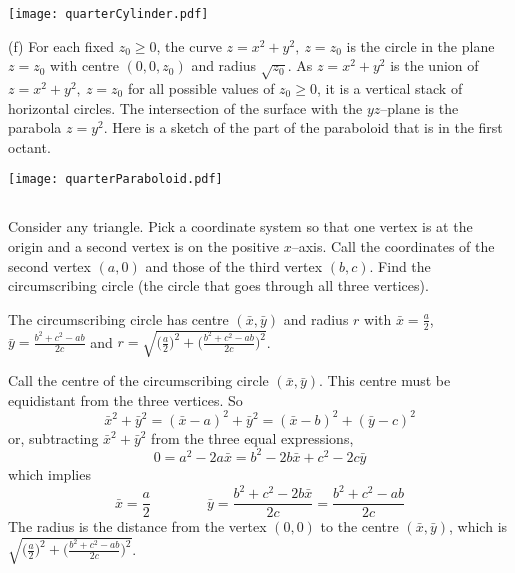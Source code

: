\begin{solution}
\begin{center}
     \texttt{[image: quarterCylinder.pdf]}
\end{center}


(f)
For each fixed $z_0\ge 0$, the curve $z = x^2 + y^2,\ z=z_0$ is the circle in the plane $z=z_0$ with centre $(0,0,z_0)$ and radius $\sqrt{z_0}$. As 
$z = x^2 + y^2$ is the union of $z = x^2 + y^2,\ z=z_0$ for all 
possible values of $z_0\ge 0$, it is  a vertical stack of horizontal circles.
The intersection of the surface with the $yz$--plane is the parabola
$z=y^2$.  Here is a sketch of the part of the paraboloid that is in the 
first octant.

\begin{center}
     \texttt{[image: quarterParaboloid.pdf]}
\end{center}


\end{solution}




\subsection*{\Procedural}


\begin{question}
Consider any triangle. Pick a coordinate system so that one vertex
is at the origin and a second vertex is on the positive $x$--axis. Call
the coordinates of the second vertex $(a,0)$ and those of the third vertex
$(b,c)$. Find the circumscribing circle (the circle that goes through all
three vertices).
\end{question}

%


\begin{answer}
The circumscribing circle has centre $(\bar x,\bar y)$ and radius $r$
with $\bar x=\frac{a}{2}$, $\bar y=\frac{b^2+c^2-ab}{2c}$ and
$r=\sqrt{\big(\frac{a}{2}\big)^2+\big(\frac{b^2+c^2-ab}{2c}\big)^2}$.
\end{answer}


\begin{solution}
Call the centre of the circumscribing circle 
$(\bar x,\bar y)$. This centre must be equidistant from the three vertices.
So
\begin{equation*}
\bar x^2+\bar y^2=(\bar x-a)^2+\bar y^2=(\bar x-b)^2+(\bar y-c)^2 
\end{equation*}
or, subtracting $\bar x^2+\bar y^2$ from the three equal expressions,
\begin{equation*}
0=a^2-2a\bar x=b^2-2b\bar x+c^2-2c\bar y
\end{equation*}
which implies
\begin{equation*}
\bar x=\frac{a}{2}\qquad\qquad \bar y
=\frac{b^2+c^2-2b\bar x}{2c}=\frac{b^2+c^2-ab}{2c}
\end{equation*}
The radius is the distance from the vertex $(0,0)$ to the centre 
$(\bar x,\bar y)$, which is
$\sqrt{\big(\frac{a}{2}\big)^2+\big(\frac{b^2+c^2-ab}{2c}\big)^2}$.

\end{solution}

